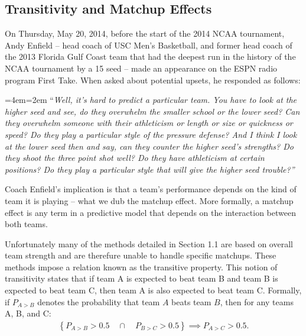 \documentclass[letterpaper,12pt]{article}
\newenvironment{blockquote}{%
  \par%
  \medskip
  \leftskip=4em\rightskip=2em%
  \noindent\ignorespaces}{%
  \par\medskip}
\begin{document}
\subsection{Transitivity and Matchup Effects}
On Thursday, May 20, 2014, before the start of the 2014 NCAA tournament, Andy Enfield -- head coach of USC Men's Basketball, and former head coach of the 2013 Florida Gulf Coast team that had the deepest run in the history of the NCAA tournament by a 15 seed -- made an appearance on the ESPN radio program First Take. When asked about potential upsets, he responded as follows:
\begin{blockquote}
``\emph{Well, it's hard to predict a particular team. You have to look at the higher seed and see, do they overwhelm the smaller school or the lower seed? Can they overwhelm someone with their athleticism or length or size or quickness or speed? Do they play a particular style of the pressure defense? And I think I look at the lower seed then and say, can they counter the higher seed's strengths? Do they shoot the three point shot well? Do they have athleticism at certain positions? Do they play a particular style that will give the higher seed trouble?''}
\end{blockquote}
%
\noindent Coach Enfield's implication is that a team's performance depends on the kind of team it is playing -- what we dub the matchup effect. More formally, a matchup effect is any term in a predictive model that depends on the interaction between both teams. 

Unfortunately many of the methods detailed in Section 1.1 are based on overall team strength and are therefure unable to handle specific matchups. These methods impose a relation known as the transitive property. This notion of transitivity states that if team A is expected to beat team B and team B is expected to beat team C, then team A is also expected to beat team C. Formally, if $P_{A>B}$ denotes the probability that team $A$ beats team $B$, then for any teams A, B, and C: 
\begin{eqnarray*}
\left \{P_{A>B} > 0.5 \quad \cap \quad P_{B>C} > 0.5 \right\} \implies P_{A>C} > 0.5.
\label{eq:trans}
\end{eqnarray*}
\end{document}

